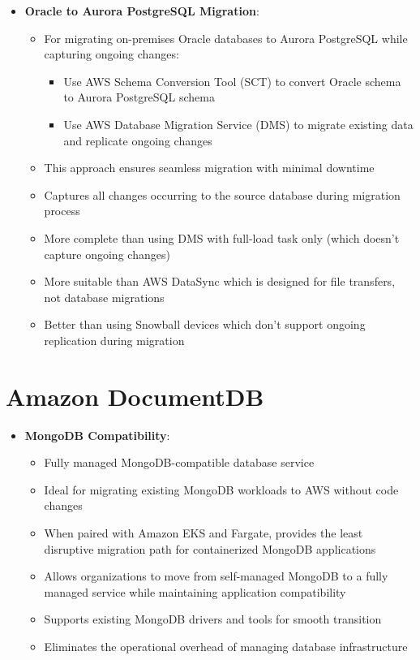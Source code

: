 \documentclass[11pt,a4paper]{report}
\begin{document}
\begin{itemize}
\begin{itemize}
  \item More suitable than Compute Optimized Snowball for straightforward data migrations
  \item Less expensive and faster to set up than dedicated Direct Connect for one-time migrations
  \item Provides a balanced approach between cost and minimizing downtime
\end{itemize}
  \item \textbf{Oracle to Aurora PostgreSQL Migration}:
\begin{itemize}
  \item For migrating on-premises Oracle databases to Aurora PostgreSQL while capturing ongoing changes:
\begin{itemize}
  \item Use AWS Schema Conversion Tool (SCT) to convert Oracle schema to Aurora PostgreSQL schema
  \item Use AWS Database Migration Service (DMS) to migrate existing data and replicate ongoing changes
\end{itemize}
  \item This approach ensures seamless migration with minimal downtime
  \item Captures all changes occurring to the source database during migration process
  \item More complete than using DMS with full-load task only (which doesn't capture ongoing changes)
  \item More suitable than AWS DataSync which is designed for file transfers, not database migrations
  \item Better than using Snowball devices which don't support ongoing replication during migration
\end{itemize}
\end{itemize}


\section{Amazon DocumentDB}

\begin{itemize}
  \item \textbf{MongoDB Compatibility}:
\begin{itemize}
  \item Fully managed MongoDB-compatible database service
  \item Ideal for migrating existing MongoDB workloads to AWS without code changes
  \item When paired with Amazon EKS and Fargate, provides the least disruptive migration path for containerized MongoDB applications
  \item Allows organizations to move from self-managed MongoDB to a fully managed service while maintaining application compatibility
  \item Supports existing MongoDB drivers and tools for smooth transition
  \item Eliminates the operational overhead of managing database infrastructure
\end{itemize}
\end{itemize}
\end{document}

